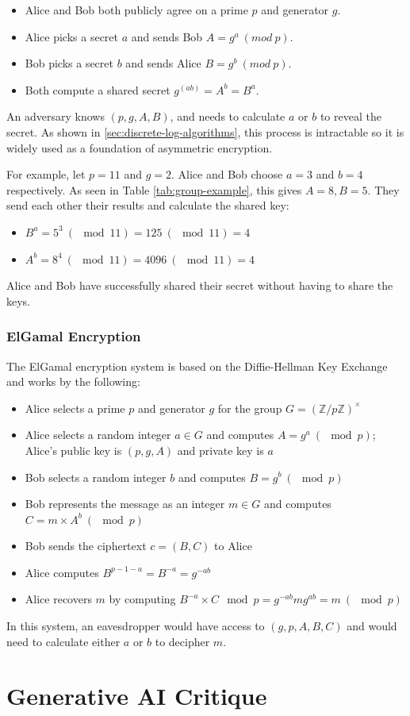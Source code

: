 \documentclass{article}
\begin{document}
\begin{itemize}
    \item Alice and Bob both publicly agree on a prime $p$ and generator $g$.
    \item Alice picks a secret $a$ and sends Bob $A = g^a \ (mod \ p)$.
    \item Bob picks a secret $b$ and sends Alice $B = g^b \ (mod \ p)$.
    \item Both compute a shared secret $g^{(ab)} = A^b = B^a$.
\end{itemize}
An adversary knows $(p, g, A, B)$, and needs to calculate $a$ or $b$ to reveal the secret. As shown in \ref{sec:discrete-log-algorithms}, this process is intractable so it is widely used as a foundation of asymmetric encryption.

For example, let $p = 11$ and $g = 2$. Alice and Bob choose $a = 3$ and $b = 4$ respectively. As seen in Table \ref{tab:group-example}, this gives $A = 8, B = 5$. They send each other their results and calculate the shared key: 
\begin{itemize}
    \item $B^a = 5^3 \ (\mod 11) = 125 \ (\mod 11) = 4$
    \item $A^b = 8^4 \ (\mod 11) = 4096 \ (\mod 11) = 4$
\end{itemize}
Alice and Bob have successfully shared their secret without having to share the keys.

\subsubsection{ElGamal Encryption}

The ElGamal encryption system \cite{Elgamal1985A} is based on the Diffie-Hellman Key Exchange and works by the following:
\begin{itemize}
    \item Alice selects a prime $p$ and generator $g$ for the group $G = (\mathbb{Z}/p\mathbb{Z})^\times$
    \item Alice selects a random integer $a \in G$ and computes $A = g^a \ (\mod p)$; Alice's public key is $(p, g, A)$ and private key is $a$
    \item Bob selects a random integer $b$ and computes $B = g^b \ (\mod p)$
    \item Bob represents the message as an integer $m \in G$ and computes $C=m \times A^b \ (\mod p)$
    \item Bob sends the ciphertext $c = (B, C)$ to Alice
    \item Alice computes $B^{p-1-a} = B^{-a} = g^{-ab}$
    \item Alice recovers $m$ by computing $B^{-a} \times C  \mod  p = g^{-ab}mg^{ab} = m \ (\mod p)$
\end{itemize}

In this system, an eavesdropper would have access to $(g, p, A, B, C)$ and would need to calculate either $a$ or $b$ to decipher $m$.

\newpage
\section{Generative AI Critique}

\newpage


\end{document}
